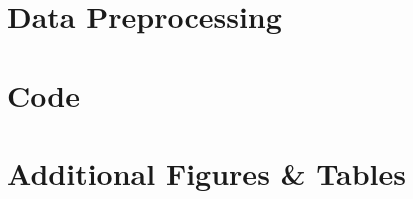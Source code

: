 \documentclass{article}\usepackage[]{graphicx}\usepackage[]{color}
\begin{document}
\section{Data Preprocessing}

\section{Code}

\section{Additional Figures \& Tables}

\end{document}
